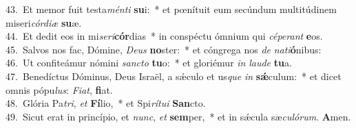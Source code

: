 {43.~}Et memor fuit testa\textit{mén}\textit{ti} \textbf{su}i:~* et pœnítuit eum secúndum multitúdinem miseri\textit{cór}\textit{di}\textit{æ} \textbf{su}æ.\\
{44.~}Et dedit eos in mi\textit{se}\textit{ri}\textbf{cór}dias~* in conspéctu ómnium qui \textit{cé}\textit{pe}\textit{rant} \textbf{e}os.\\
{45.~}Salvos nos fac, Dómine, \textit{De}\textit{us} \textbf{no}ster:~* et cóngrega nos \textit{de} \textit{na}\textit{ti}\textbf{ó}nibus:\\
{46.~}Ut confiteámur nómini \textit{san}\textit{cto} \textbf{tu}o:~* et gloriémur \textit{in} \textit{lau}\textit{de} \textbf{tu}a.\\
{47.~}Benedíctus Dóminus, Deus Israël, a sǽculo et us\textit{que} \textit{in} \textbf{sǽ}culum:~* et dicet omnis pópu\textit{lus}: \textit{Fi}\textit{at}, \textbf{fi}at.\\
{48.~}Glória Pa\textit{tri}, \textit{et} \textbf{Fí}lio,~* et Spi\textit{rí}\textit{tu}\textit{i} \textbf{San}cto.\\
{49.~}Sicut erat in princípio, et \textit{nunc}, \textit{et} \textbf{sem}per,~* et in sǽcula sæ\textit{cu}\textit{ló}\textit{rum}. \textbf{A}men.\\

